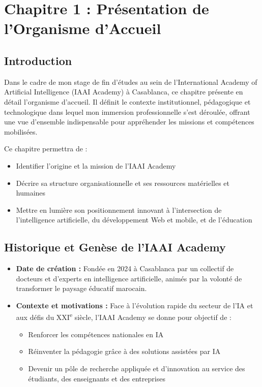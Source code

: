 \chapter*{Chapitre 1 : Présentation de l'Organisme d'Accueil}
\thispagestyle{fancy}
\setcounter{section}{0}
\newpage

\section{Introduction}

Dans le cadre de mon stage de fin d'études au sein de l'International Academy of Artificial Intelligence (IAAI Academy) à Casablanca, ce chapitre présente en détail l'organisme d'accueil. Il définit le contexte institutionnel, pédagogique et technologique dans lequel mon immersion professionnelle s'est déroulée, offrant une vue d'ensemble indispensable pour appréhender les missions et compétences mobilisées.

Ce chapitre permettra de :
\begin{itemize}
  \item Identifier l'origine et la mission de l'IAAI Academy
  \item Décrire sa structure organisationnelle et ses ressources matérielles et humaines
  \item Mettre en lumière son positionnement innovant à l'intersection de l'intelligence artificielle, du développement Web et mobile, et de l'éducation
\end{itemize}

\section{Historique et Genèse de l'IAAI Academy}

\begin{itemize}
  \item \textbf{Date de création :} Fondée en 2024 à Casablanca par un collectif de docteurs et d'experts en intelligence artificielle, animés par la volonté de transformer le paysage éducatif marocain.
  
  \item \textbf{Contexte et motivations :} Face à l'évolution rapide du secteur de l'IA et aux défis du XXI\textsuperscript{e} siècle, l'IAAI Academy se donne pour objectif de :
  \begin{itemize}
    \item Renforcer les compétences nationales en IA
    \item Réinventer la pédagogie grâce à des solutions assistées par IA
    \item Devenir un pôle de recherche appliquée et d'innovation au service des étudiants, des enseignants et des entreprises
  \end{itemize}
\end{itemize}

